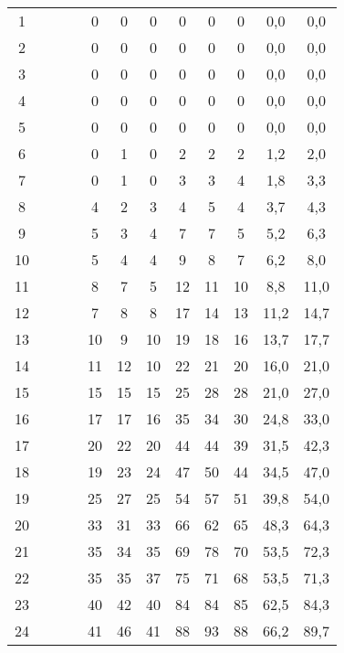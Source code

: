 \begin{center}
\begin{longtable}{|c|c|c|c|c|c|c|c|c|c|c|c|}
		1  &   &   &   & 0  & 0  & 0  & 0   & 0   & 0   & 0,0      & 0,0    \\
		2  &   &   &   & 0  & 0  & 0  & 0   & 0   & 0   & 0,0      & 0,0    \\
		3  &   &   &   & 0  & 0  & 0  & 0   & 0   & 0   & 0,0      & 0,0    \\
		4  &   &   &   & 0  & 0  & 0  & 0   & 0   & 0   & 0,0      & 0,0    \\
		5  &   &   &   & 0  & 0  & 0  & 0   & 0   & 0   & 0,0      & 0,0    \\
		6  &   &   &   & 0  & 1  & 0  & 2   & 2   & 2   & 1,2      & 2,0    \\
		7  &   &   &   & 0  & 1  & 0  & 3   & 3   & 4   & 1,8      & 3,3    \\
		8  &   &   &   & 4  & 2  & 3  & 4   & 5   & 4   & 3,7      & 4,3    \\
		9  &   &   &   & 5  & 3  & 4  & 7   & 7   & 5   & 5,2      & 6,3    \\
		10 &   &   &   & 5  & 4  & 4  & 9   & 8   & 7   & 6,2      & 8,0    \\
		11 &   &   &   & 8  & 7  & 5  & 12  & 11  & 10  & 8,8      & 11,0   \\
		12 &   &   &   & 7  & 8  & 8  & 17  & 14  & 13  & 11,2     & 14,7   \\
		13 &   &   &   & 10 & 9  & 10 & 19  & 18  & 16  & 13,7     & 17,7   \\
		14 &   &   &   & 11 & 12 & 10 & 22  & 21  & 20  & 16,0     & 21,0   \\
		15 &   &   &   & 15 & 15 & 15 & 25  & 28  & 28  & 21,0     & 27,0   \\
		16 &   &   &   & 17 & 17 & 16 & 35  & 34  & 30  & 24,8     & 33,0   \\
		17 &   &   &   & 20 & 22 & 20 & 44  & 44  & 39  & 31,5     & 42,3   \\
		18 &   &   &   & 19 & 23 & 24 & 47  & 50  & 44  & 34,5     & 47,0   \\
		19 &   &   &   & 25 & 27 & 25 & 54  & 57  & 51  & 39,8     & 54,0   \\
		20 &   &   &   & 33 & 31 & 33 & 66  & 62  & 65  & 48,3     & 64,3   \\
		21 &   &   &   & 35 & 34 & 35 & 69  & 78  & 70  & 53,5     & 72,3   \\
		22 &   &   &   & 35 & 35 & 37 & 75  & 71  & 68  & 53,5     & 71,3   \\
		23 &   &   &   & 40 & 42 & 40 & 84  & 84  & 85  & 62,5     & 84,3   \\
		24 &   &   &   & 41 & 46 & 41 & 88  & 93  & 88  & 66,2     & 89,7   \\

\end{longtable}
\end{center}
